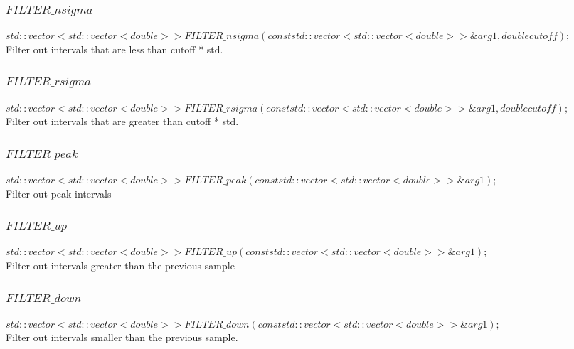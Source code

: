 \documentclass{article}
\begin{document}
\begin{CJK}{UTF8}{gbsn}
\begin{spacing}{1.5}






\subsubsection{$FILTER\_nsigma$}
$std::vector<std::vector<double>> FILTER\_nsigma(const std::vector<std::vector<double>> \&arg1, double cutoff);$\\
Filter out intervals that are less than cutoff * std.\\

\subsubsection{$FILTER\_rsigma$}
$std::vector<std::vector<double>> FILTER\_rsigma(const std::vector<std::vector<double>> \&arg1, double cutoff);$\\
Filter out intervals that are greater than cutoff * std.\\

\subsubsection{$FILTER\_peak$}
$std::vector<std::vector<double>> FILTER\_peak(const std::vector<std::vector<double>> \&arg1);$\\
Filter out peak intervals\\

\subsubsection{$FILTER\_up$}
$std::vector<std::vector<double>> FILTER\_up(const std::vector<std::vector<double>> \&arg1) ;$\\
Filter out intervals greater than the previous sample\\

\subsubsection{$FILTER\_down$}
$std::vector<std::vector<double>> FILTER\_down(const std::vector<std::vector<double>> \&arg1) ;$\\
Filter out intervals smaller than the previous sample.\\


\end{spacing}
\end{CJK}
\end{document}
